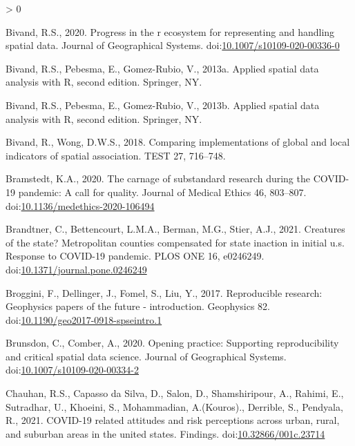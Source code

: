 \documentclass[]{elsarticle} %
\newlength{\cslhangindent}
\newenvironment{CSLReferences}[2] %
 {%
  \setlength{\parindent}{0pt}
  \ifodd #1 \everypar{\setlength{\hangindent}{\cslhangindent}}\ignorespaces\fi
  \ifnum #2 > 0
  \setlength{\parskip}{#2\baselineskip}
  \fi
 }%
 {}
\begin{document}
\begin{CSLReferences}{1}{0}
\leavevmode\hypertarget{ref-Bivand2020progress}{}%
Bivand, R.S., 2020. Progress in the r ecosystem for representing and
handling spatial data. Journal of Geographical Systems.
doi:\href{https://doi.org/10.1007/s10109-020-00336-0}{10.1007/s10109-020-00336-0}

\leavevmode\hypertarget{ref-sp2013}{}%
Bivand, R.S., Pebesma, E., Gomez-Rubio, V., 2013a. Applied spatial data
analysis with {R}, second edition. Springer, NY.

\leavevmode\hypertarget{ref-spdep2013}{}%
Bivand, R.S., Pebesma, E., Gomez-Rubio, V., 2013b. Applied spatial data
analysis with {R}, second edition. Springer, NY.

\leavevmode\hypertarget{ref-spdep2018}{}%
Bivand, R., Wong, D.W.S., 2018. Comparing implementations of global and
local indicators of spatial association. TEST 27, 716--748.

\leavevmode\hypertarget{ref-Bramstedt2020carnage}{}%
Bramstedt, K.A., 2020. The carnage of substandard research during the
COVID-19 pandemic: A call for quality. Journal of Medical Ethics 46,
803--807.
doi:\href{https://doi.org/10.1136/medethics-2020-106494}{10.1136/medethics-2020-106494}

\leavevmode\hypertarget{ref-Brandtner2021creatures}{}%
Brandtner, C., Bettencourt, L.M.A., Berman, M.G., Stier, A.J., 2021.
Creatures of the state? Metropolitan counties compensated for state
inaction in initial u.s. Response to COVID-19 pandemic. PLOS ONE 16,
e0246249.
doi:\href{https://doi.org/10.1371/journal.pone.0246249}{10.1371/journal.pone.0246249}

\leavevmode\hypertarget{ref-Broggini2017reproducible}{}%
Broggini, F., Dellinger, J., Fomel, S., Liu, Y., 2017. Reproducible
research: Geophysics papers of the future - introduction. Geophysics 82.
doi:\href{https://doi.org/10.1190/geo2017-0918-spseintro.1}{10.1190/geo2017-0918-spseintro.1}

\leavevmode\hypertarget{ref-Brunsdon2020opening}{}%
Brunsdon, C., Comber, A., 2020. Opening practice: Supporting
reproducibility and critical spatial data science. Journal of
Geographical Systems.
doi:\href{https://doi.org/10.1007/s10109-020-00334-2}{10.1007/s10109-020-00334-2}

\leavevmode\hypertarget{ref-Chauhan2021covid}{}%
Chauhan, R.S., Capasso da Silva, D., Salon, D., Shamshiripour, A.,
Rahimi, E., Sutradhar, U., Khoeini, S., Mohammadian, A.(Kouros).,
Derrible, S., Pendyala, R., 2021. COVID-19 related attitudes and risk
perceptions across urban, rural, and suburban areas in the united
states. Findings.
doi:\href{https://doi.org/10.32866/001c.23714}{10.32866/001c.23714}


\end{CSLReferences}
\end{document}
